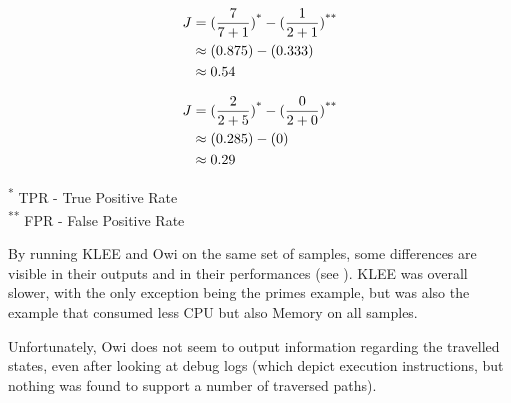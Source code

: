 \begin{mycapequ}[htbp]
\begin{minipage}{.49\linewidth}
    \begin{equation}
      \begin{aligned}
        J & = (\frac{7}{7+1})\textsuperscript{*} - (\frac{1}{2+1})\textsuperscript{**} \\
          & \approx (0.875) - (0.333) \\
          & \approx 0.54
      \end{aligned}
    \label{equ:klee_youden_index}
    \end{equation}
    \caption{KLEE Youden Index}
\end{minipage}
\begin{minipage}{.49\linewidth}
    \begin{equation}
      \begin{aligned}
        J & = (\frac{2}{2+5})\textsuperscript{*} - (\frac{0}{2+0})\textsuperscript{**} \\
          & \approx (0.285) - (0) \\
          & \approx 0.29
      \end{aligned}
    \label{equ:owi_youden_index}
    \end{equation}
    \caption{Owi Youden Index}
\end{minipage}

\noindent
\textsuperscript{*} {\footnotesize TPR - True Positive Rate} \\
\textsuperscript{**} {\footnotesize FPR - False Positive Rate}
\end{mycapequ}



By running KLEE and Owi on the same set of samples, some differences are visible in their outputs and in their performances (see ). KLEE was overall slower, with the only exception being the primes example, but was also the example that consumed less CPU but also Memory on all samples.

Unfortunately, Owi does not seem to output information regarding the travelled states, even after looking at debug logs (which depict execution instructions, but nothing was found to support a number of traversed paths).

